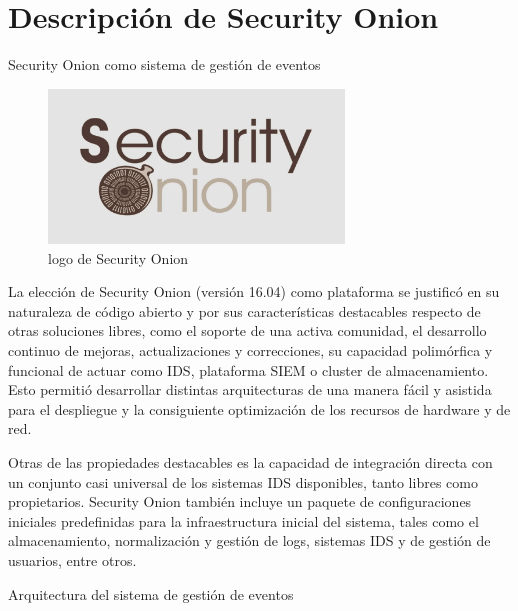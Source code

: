 \chapter{\Large Descripción de Security Onion}
    \begin{section}{Security Onion como sistema de gestión de eventos}
    \begin{figure}[H]
        \centering
        \includegraphics[width=0.7\textwidth]{./descripcion_sonion_imagenes/figura_15_logo_sonion.png}
        \caption{logo de Security Onion\cite{sonion}}
        \label{fig:logo_sonion}
    \end{figure}
        La elección de Security Onion (versión 16.04) como plataforma se justificó en su naturaleza de código abierto y por sus características destacables respecto de otras soluciones libres, como el soporte de una activa comunidad, el desarrollo continuo de mejoras, actualizaciones y correcciones, su capacidad polimórfica y funcional de actuar como IDS, plataforma SIEM o cluster de almacenamiento. Esto permitió desarrollar distintas arquitecturas de una manera fácil y asistida para el despliegue y la consiguiente optimización de los recursos de hardware y de red. \par
        Otras de las propiedades destacables es la capacidad de integración directa con un conjunto casi universal de los sistemas IDS disponibles, tanto libres como propietarios. Security Onion también incluye un paquete de configuraciones iniciales predefinidas para la infraestructura inicial del sistema, tales como el almacenamiento, normalización y gestión de logs, sistemas IDS y de gestión de usuarios, entre otros. \par
    \end{section}
    \begin{section}{Arquitectura del sistema de gestión de eventos}
    \end{section}

